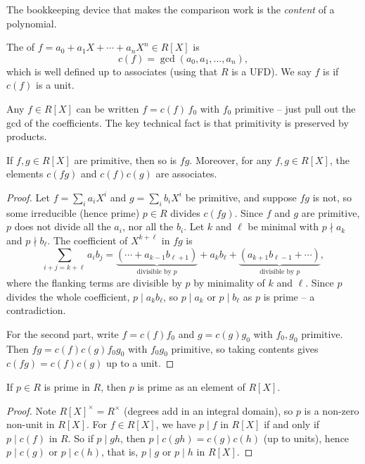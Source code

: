 \documentclass[a4paper]{scrartcl}
\begin{document}
The bookkeeping device that makes the comparison work is the \emph{content} of a polynomial.

\begin{definition}
	The  of $f = a_0 + a_1 X + \cdots + a_n X^n \in R[X]$ is
	$$
	c(f) = \gcd(a_0, a_1, \dots, a_n),
	$$
	which is well defined up to associates (using that $R$ is a UFD). We say $f$ is  if $c(f)$ is a unit.
\end{definition}

Any $f \in R[X]$ can be written $f = c(f)\, f_0$ with $f_0$ primitive -- just pull out the gcd of the coefficients. The key technical fact is that primitivity is preserved by products.

\begin{lemma}
	If $f, g \in R[X]$ are primitive, then so is $fg$. Moreover, for any $f, g \in R[X]$, the elements $c(fg)$ and $c(f)c(g)$ are associates.
\end{lemma}
\begin{proof}
	Let $f = \sum_{i} a_i X^i$ and $g = \sum_{i} b_i X^i$ be primitive, and suppose $fg$ is not, so some irreducible (hence prime) $p \in R$ divides $c(fg)$. Since $f$ and $g$ are primitive, $p$ does not divide all the $a_i$, nor all the $b_i$. Let $k$ and $\ell$ be minimal with $p \nmid a_k$ and $p \nmid b_\ell$. The coefficient of $X^{k + \ell}$ in $fg$ is
	$$
	\sum_{i + j = k + \ell} a_i b_j = \underbrace{(\cdots + a_{k - 1}b_{\ell + 1})}_{\text{divisible by } p} + a_k b_\ell + \underbrace{(a_{k+1}b_{\ell - 1} + \cdots)}_{\text{divisible by } p},
	$$
	where the flanking terms are divisible by $p$ by minimality of $k$ and $\ell$. Since $p$ divides the whole coefficient, $p \mid a_k b_\ell$, so $p \mid a_k$ or $p \mid b_\ell$ as $p$ is prime -- a contradiction.

	For the second part, write $f = c(f)f_0$ and $g = c(g)g_0$ with $f_0, g_0$ primitive. Then $fg = c(f)c(g) f_0 g_0$ with $f_0 g_0$ primitive, so taking contents gives $c(fg) = c(f)c(g)$ up to a unit.
\end{proof}

\begin{corollary}
	If $p \in R$ is prime in $R$, then $p$ is prime as an element of $R[X]$.
\end{corollary}
\begin{proof}
	Note $R[X]^{\times} = R^{\times}$ (degrees add in an integral domain), so $p$ is a non-zero non-unit in $R[X]$. For $f \in R[X]$, we have $p \mid f$ in $R[X]$ if and only if $p \mid c(f)$ in $R$. So if $p \mid gh$, then $p \mid c(gh) = c(g)c(h)$ (up to units), hence $p \mid c(g)$ or $p \mid c(h)$, that is, $p \mid g$ or $p \mid h$ in $R[X]$.
\end{proof}
\end{document}
